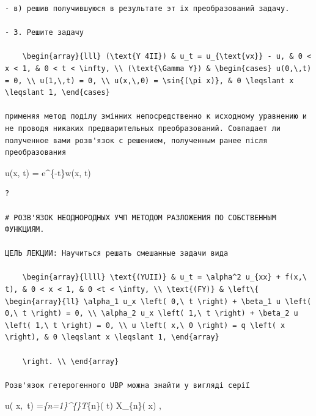 \documentclass[
  ukrainian,
]{article}
\begin{document}
\begin{verbatim}
- в) решив получившуюся в результате эт іх преобразований задачу.

- 3. Решите задачу

    \begin{array}{lll} (\text{Y 4II}) & u_t = u_{\text{vx}} - u, & 0 < x < 1, & 0 < t < \infty, \\ (\text{\Gamma Y}) & \begin{cases} u(0,\,t) = 0, \\ u(1,\,t) = 0, \\ u(x,\,0) = \sin{(\pi x)}, & 0 \leqslant x \leqslant 1, \end{cases}

применяя метод поділу змінних непосредственно к исходному уравнению и не проводя никаких предварительных преобразований. Совпадает ли полученное вами розв'язок с решением, полученным ранее після преобразования
\end{verbatim}

u(x, t) = e\^{}\{-t\}w(x, t)

\begin{verbatim}
?

# РОЗВ'ЯЗОК НЕОДНОРОДНЫХ УЧП МЕТОДОМ РАЗЛОЖЕНИЯ ПО СОБСТВЕННЫМ ФУНКЦИЯМ.

ЦЕЛЬ ЛЕКЦИИ: Научиться решать смешанные задачи вида

    \begin{array}{llll} \text{(YUII)} & u_t = \alpha^2 u_{xx} + f(x,\ t), & 0 < x < 1, & 0 <t < \infty, \\ \text{(FY)} & \left\{ \begin{array}{ll} \alpha_1 u_x \left( 0,\ t \right) + \beta_1 u \left( 0,\ t \right) = 0, \\ \alpha_2 u_x \left( 1,\ t \right) + \beta_2 u \left( 1,\ t \right) = 0, \\ u \left( x,\ 0 \right) = q \left( x \right), & 0 \leqslant x \leqslant 1, \end{array}

    \right. \\ \end{array}

Розв'язок гетерогенного UBP можна знайти у вигляді серії
\end{verbatim}

u\left( x,~t\right) =\sum\emph{\{n=1\}\^{}\{\infty\}T}\{n\}\left(
t\right) X\_\{n\}\left( x\right) ,
\end{document}
